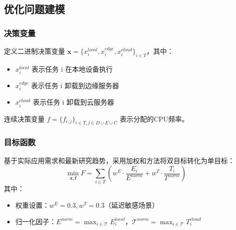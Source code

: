 \documentclass[conference]{IEEEtran}
\begin{document}
\subsection{优化问题建模}
\subsubsection{决策变量}
定义二进制决策变量 $\mathbf{x} = \{x_i^{local}, x_i^{edge}, x_i^{cloud}\}_{i \in {T}}$，其中：
\begin{itemize}
    \item ${x}_{i}^{local}$ 表示任务 i 在本地设备执行
    \item ${x}_{i}^{edge}$ 表示任务 i 卸载到边缘服务器
    \item ${x}_{i}^{cloud}$ 表示任务 i 卸载到云服务器
\end{itemize}
连续决策变量 ${f} = \{f_{i,j}\}_{i \in {T}, j \in {D} \cup {E} \cup {C}}$ 表示分配的CPU频率。
\subsubsection{目标函数}
基于实际应用需求和最新研究趋势，采用加权和方法将双目标转化为单目标：
\begin{equation}
\min_{\mathbf{x}, \mathbf{f}} F = \sum_{i \in {T}} \left( w^E \cdot \frac{E_i}{E^{norm}} + w^T \cdot \frac{T_i}{T^{norm}} \right)
\end{equation}
其中：
\begin{itemize}
    \item 权重设置：$\mathcal{}w^{E}=0.3, {w}^{T}=0.3$（延迟敏感场景）
    \item 归一化因子：$\mathcal{}E^{norm} = \max_{i \in \mathcal{T}} E_i^{local}$，$\mathcal{T}^{norm} = \max_{i \in \mathcal{T}} T_i^{cloud}$
\end{itemize}
\end{document}
